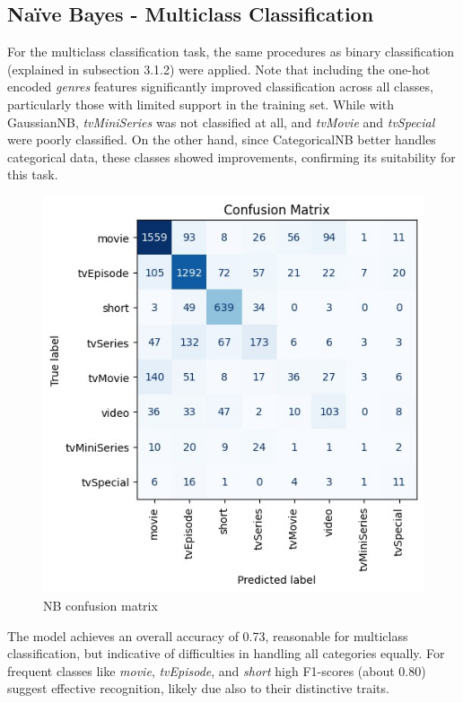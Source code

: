 \subsection{Naïve Bayes - Multiclass Classification} 
For the multiclass classification task, the same procedures as binary classification (explained in subsection 3.1.2) were applied. 
Note that including the one-hot encoded \textit{genres} features significantly improved classification across all classes, particularly those with limited support in the training set. 
While with GaussianNB, \textit{tvMiniSeries} was not classified at all, and \textit{tvMovie} and \textit{tvSpecial} were poorly classified. 
On the other hand, since CategoricalNB better handles categorical data, these classes showed improvements, confirming its suitability for this task.\\   
\begin{figure}
    \centering
    \captionsetup{justification=raggedleft, width=1\linewidth}
    \caption{NB confusion matrix}
    \label{fig:nb_multiclass}
    \includegraphics[width=0.9\linewidth]{plots/nb_multiclass_confmatrix.jpg}
\end{figure}
The model achieves an overall accuracy of 0.73, reasonable for multiclass classification, but indicative of difficulties in handling all categories equally. 
For frequent classes like \textit{movie}, \textit{tvEpisode}, and \textit{short} high F1-scores (about 0.80) suggest effective recognition, likely due also to their distinctive traits. 
